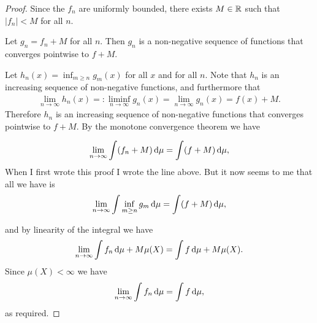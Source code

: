 \begin{proof}
  Since the $f_n$ are uniformly bounded, there exists $M \in \mathbb{R}$ such that $|f_n| < M$ for all $n$.

  Let $g_n = f_n + M$ for all $n$. Then $g_n$ is a non-negative sequence of functions that converges
  pointwise to $f + M$.

  Let $h_n(x) = \inf_{m \geq n} g_m(x)$ for all $x$ and for all $n$. Note that $h_n$ is an increasing sequence
  of non-negative functions, and furthermore that
  \begin{align*}
    \lim_{n \to \infty} h_n(x) =: \liminf_{n \to \infty} g_n(x) = \lim_{n \to \infty} g_n(x) = f(x) + M.
  \end{align*}
  Therefore $h_n$ is an increasing sequence of non-negative functions that converges pointwise to $f + M$. By
  the monotone convergence theorem we have
  \begin{mdframed}
    \begin{align*}
    \lim_{n\to\infty} \int (f_n + M) \d\mu = \int (f + M) \d\mu,
    \end{align*}
   When I first wrote this proof I wrote the line above. But it now seems to me that all we have is
  \begin{align*}
    \lim_{n\to\infty} \int \inf_{m \geq n} g_m \d\mu = \int (f + M) \d\mu,
  \end{align*}
  \end{mdframed}
  and by linearity of the integral we have
  \begin{align*}
    \lim_{n\to\infty} \int f_n \d\mu + M \mu(X) = \int f \d\mu + M \mu(X).
  \end{align*}
  Since $\mu(X) < \infty$ we have
  \begin{align*}
    \lim_{n\to\infty} \int f_n \d\mu = \int f \d\mu,
  \end{align*}
  as required.
\end{proof}
